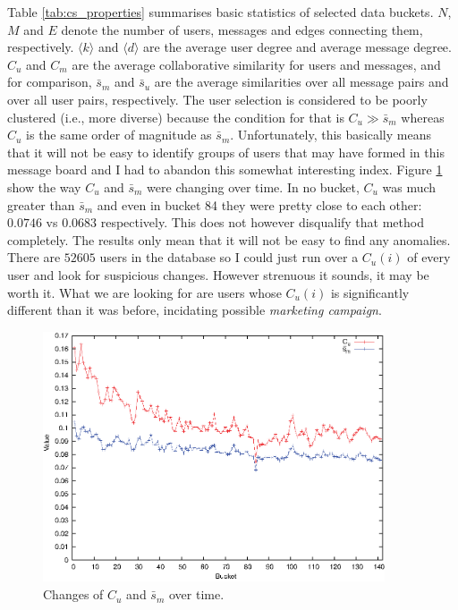       Table \ref{tab:cs_properties} summarises basic statistics of selected data buckets. $N$, $M$ and $E$ denote the number of users, messages and edges connecting them, respectively. $\langle k \rangle$ and $\langle d \rangle$ are the average user degree and average message degree. $C_u$ and $C_m$ are the average collaborative similarity for users and messages, and for comparison, $\bar s_m$ and $\bar s_u$ are the average similarities over all message pairs and over all user pairs, respectively. The user selection is considered to be poorly clustered (i.e., more diverse) because the condition for that is $C_u \gg \bar s_m$ whereas $C_u$ is the same order of magnitude as $\bar s_m$. Unfortunately, this basically means that it will not be easy to identify groups of users that may have formed in this message board and I had to abandon this somewhat interesting index. Figure \ref{fig:cs_cusm} show the way $C_u$ and $\bar s_m$ were changing over time. In no bucket, $C_u$ was much greater than $\bar s_m$ and even in bucket 84 they were pretty close to each other: $0.0746$ vs $0.0683$ respectively.
      This does not however disqualify that method completely. The results only mean that it will not be easy to find any anomalies. There are $52605$ users in the database so I could just run over a $C_u(i)$ of every user and look for suspicious changes. However strenuous it sounds, it may be worth it. What we are looking for are users whose $C_u(i)$ is significantly different than it was before, incidating possible \emph{marketing campaign}.
      \begin{figure}[H]
        \includegraphics[width=0.9\textwidth]{chapters/03_implementation/C_us_m}
        \caption{Changes of $C_u$ and $\bar s_m$ over time.}
        \label{fig:cs_cusm}
      \end{figure}


